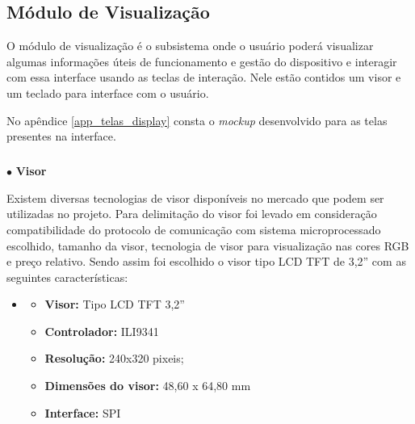 
\subsection{Módulo de Visualização}
    
    O módulo de visualização é o subsistema onde o usuário poderá visualizar algumas informações úteis de funcionamento e gestão do dispositivo e interagir com essa interface usando as teclas de interação. Nele estão contidos um visor e um teclado para interface com o usuário.
    
    No apêndice \ref{app_telas_display} consta o \textit{mockup} desenvolvido para as telas presentes na interface.
 
        \subparagraph*{}$\bullet$ \textbf{Visor} \hfill
        
        Existem diversas tecnologias de visor disponíveis no mercado que podem ser utilizadas no projeto. Para delimitação do visor foi levado em consideração compatibilidade do protocolo de comunicação com sistema microprocessado escolhido, tamanho da visor, tecnologia de visor para visualização nas cores RGB e preço relativo. Sendo assim foi escolhido o visor tipo LCD TFT de 3,2'' com as seguintes características:
        
        \vspace{-0.2cm}
        \begin{itemize}
            \item[ ] 
            \begin{itemize}
            \item \textbf{Visor:} Tipo LCD TFT 3,2'' 
            \item \textbf{Controlador:} ILI9341
            \item \textbf{Resolução:} 240x320 pixeis;
            \item \textbf{Dimensões do visor:} 48,60 x 64,80 mm
            \item \textbf{Interface:} SPI
            \end{itemize}
        \end{itemize}
        
        
